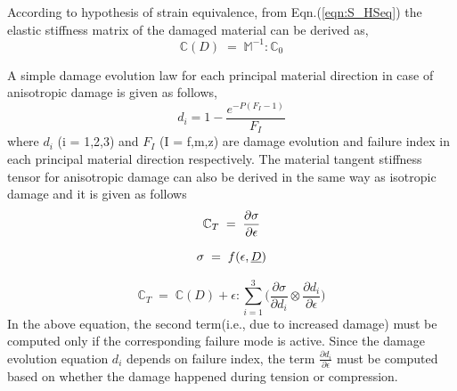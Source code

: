 \documentclass[a4paper,12pt,twoside]{report}
\begin{document}
 According to hypothesis of strain equivalence, from Eqn.(\ref{eqn:S_HSeq}) the elastic stiffness matrix of the damaged material can be derived as,\\
 \begin{equation}
\mathbb{C}(D) \; = \; \mathbb{M}^{-1} : \mathbb{C}_{0}   
\label{Damaged_elasticity_matrix_2}
\end{equation}


A simple damage evolution law for each principal material direction in case of anisotropic damage is given as follows,
\begin{equation}
d_{i} = 1 - \frac{e^{-P(F_{I} - 1)} }{F_{I}}  
\label{exponential damage equation}
\end{equation}
where $d_{i}$ (i = 1,2,3) and $F_{I}$ (I = f,m,z) are damage evolution and failure index in each principal material direction respectively.
The material tangent stiffness tensor for anisotropic damage can also be derived in the same way as isotropic damage and it is given as follows
\begin{equation*}
\large{ \mathbb{C}_{T}  \; = \;\frac{\partial \sigma}{\partial \epsilon}  }
\end{equation*}

\begin{equation*}
\large{\sigma  \; = \; f(\epsilon, \underline{D}) }
\end{equation*}

\begin{equation}
\mathbb{C}_{T}  \; = \; \mathbb{C}(D) + \epsilon : \sum_{i = 1}^{3}  \Big( \frac{\partial \sigma }{\partial d_{i}} \otimes \frac{\partial d_{i}}{\partial \epsilon }\Big)
\label{Anisotropic tangent stiffness} 
\end{equation}
In the above equation, the second term(i.e., due to increased damage) must be computed only if the corresponding failure mode is active. Since the damage evolution equation $d_{i}$ depends on failure index, the term $\frac{\partial d_{i}}{\partial \epsilon }$ must be computed based on whether the damage happened during tension or compression.
\end{document}
